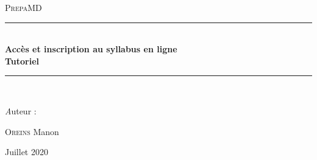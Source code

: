\begin{titlepage}

\begin{center}
\newcommand{\HRule}{\rule{\linewidth}{0.5mm}}

\vspace{1cm}
\textsc{\LARGE PrepaMD}
\vspace{7cm}

\HRule \\[1cm]
{\huge \bfseries Accès et inscription au syllabus en ligne\\ \vspace{0.4cm} Tutoriel\\[1cm]}
\HRule \\
\vspace{1.5cm}

\large{\emph Auteur : }\\
\vspace{0.3cm}

\textsc{Oreins} Manon\\

\vfill


\large Juillet 2020
\end{center}
\end{titlepage}